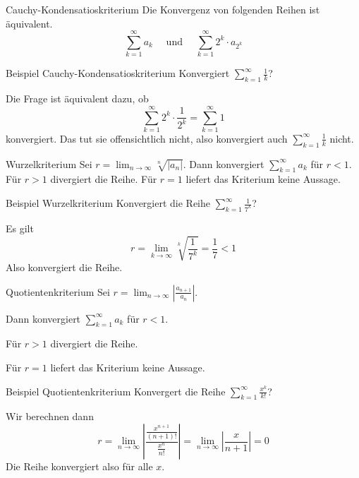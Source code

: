 \documentclass[german]{spicker}
\begin{document}
\begin{algo}{Cauchy-Kondensatioskriterium}
    Die Konvergenz von folgenden Reihen ist äquivalent.
    $$
        \sum_{k=1}^{\infty} a_k \quad \text{ und } \quad
        \sum_{k=1}^{\infty} 2^k \cdot a_{2^k}
    $$
\end{algo}

\begin{bonus}{Beispiel Cauchy-Kondensatioskriterium}
    Konvergiert $\sum_{k=1}^{\infty} \frac{1}{k}$?

    Die Frage ist äquivalent dazu, ob
    \[
        \sum_{k=1}^{\infty} 2^k \cdot \frac{1}{2^k} = \sum_{k=1}^{\infty} 1
    \]
    konvergiert. Das tut sie offensichtlich nicht, also konvergiert auch $\sum_{k=1}^{\infty} \frac{1}{k}$ nicht.
\end{bonus}

\begin{algo}{Wurzelkriterium}
    Sei $r = \lim_{n\to\infty} \sqrt[n]{|a_n|}$.
    Dann konvergiert $\sum_{k=1}^{\infty} a_k$ für $r<1$.
    Für $r>1$ divergiert die Reihe.
    Für $r=1$ liefert das Kriterium keine Aussage.
\end{algo}

\begin{bonus}{Beispiel Wurzelkriterium}
    Konvergiert die Reihe $\sum_{k=1}^{\infty} \frac{1}{7^k}$?

    Es gilt
    \[
        r = \lim_{k\to\infty} \sqrt[k]{\frac{1}{7^k}} = \frac{1}{7} < 1
    \]
    Also konvergiert die Reihe.
\end{bonus}

\begin{algo}{Quotientenkriterium}
    Sei $r = \lim_{n\to\infty} \left| \frac{a_{n+1}}{a_n} \right|$.

    Dann konvergiert $\sum_{k=1}^{\infty} a_k$ für $r<1$.

    Für $r>1$ divergiert die Reihe.

    Für $r=1$ liefert das Kriterium keine Aussage.
\end{algo}

\begin{bonus}{Beispiel Quotientenkriterium}
    Konvergert die Reihe $\sum_{k=1}^{\infty} \frac{x^k}{k!}$?

    Wir berechnen dann
    \[
        r = \lim_{n\to\infty} \left| \frac{\frac{x^{n+1}}{(n+1)!}}{\frac{x^n}{n!}} \right|
        = \lim_{n\to\infty} \left| \frac{x}{n+1} \right| = 0
    \]
    Die Reihe konvergiert also für alle $x$.
\end{bonus}
\end{document}

